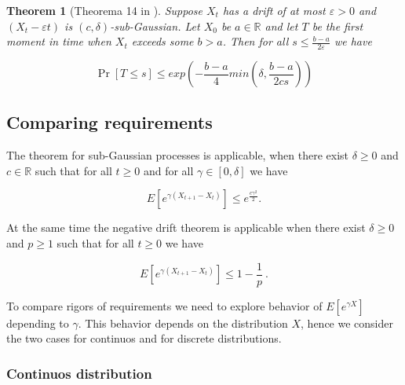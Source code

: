 \documentclass[12pt, a4paper]{article}
\newtheorem{theorem}{Theorem}[section]
\theoremstyle{remark}
\begin{document}
\begin{theorem}[Theorema 14 in \cite{Kotzing16}]
    Suppose $X_t$ has a drift of at most $\varepsilon > 0$ and $(X_t - \varepsilon t)$ is $(c, \delta)$-sub-Gaussian. Let \(X_0\) be \(a \in \mathbb{R}\) and let \(T\) be the first moment in time when \(X_t\) exceeds some \(b > a\). Then for all \(s \leq \frac{b - a}{2\varepsilon}\) we have

    \[\Pr[T \leq s] \leq exp\left(-\frac{b - a}{4} min\left(\delta, \frac{b - a}{2cs}\right)\right)\]
\end{theorem}

\subsection{Comparing requirements}
\label{sec:compare}



The theorem for sub-Gaussian processes is applicable, when there exist $\delta \geq 0$ and $c \in \mathbb{R}$ such that for all $t \geq 0$ and for all $\gamma \in [0, \delta]$ we have

$$  E\left[e^{\gamma (X_{t + 1} - X_{t})}\right] \leq e^{\frac{c \gamma^2}{2}}.$$

At the same time the negative drift theorem is applicable when there exist $\delta \geq 0$ and $p \geq 1$ such that for all $t \geq 0$ we have

$$
    E\left[e^{\gamma (X_{t + 1} - X_{t})}\right] \leq 1 - \frac{1}{p}\ .$$

To compare rigors of requirements we need to explore behavior of $E[e^{\gamma X}]$ depending to $\gamma$. This behavior depends on the distribution $X$, hence we consider the two cases for continuos and for discrete distributions.

\subsubsection*{Continuos distribution}
\end{document}
